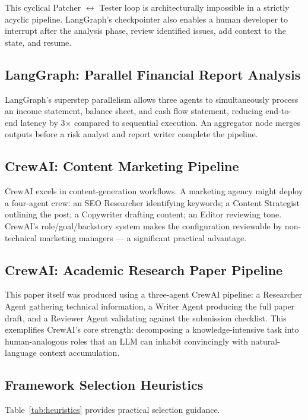 \documentclass[12pt,a4paper]{article}
\begin{document}
This cyclical Patcher $\leftrightarrow$ Tester loop is architecturally
impossible in a strictly acyclic pipeline. LangGraph's checkpointer also
enables a human developer to interrupt after the analysis phase, review
identified issues, add context to the state, and resume.

\subsection{LangGraph: Parallel Financial Report Analysis}

LangGraph's superstep parallelism allows three agents to simultaneously
process an income statement, balance sheet, and cash flow statement, reducing
end-to-end latency by 3$\times$ compared to sequential execution. An aggregator
node merges outputs before a risk analyst and report writer complete the
pipeline.

\subsection{CrewAI: Content Marketing Pipeline}

CrewAI excels in content-generation workflows. A marketing agency might deploy
a four-agent crew: an SEO Researcher identifying keywords; a Content Strategist
outlining the post; a Copywriter drafting content; an Editor reviewing tone.
CrewAI's role/goal/backstory system makes the configuration reviewable by
non-technical marketing managers --- a significant practical advantage.

\subsection{CrewAI: Academic Research Paper Pipeline}

This paper itself was produced using a three-agent CrewAI pipeline: a
Researcher Agent gathering technical information, a Writer Agent producing the
full paper draft, and a Reviewer Agent validating against the submission
checklist. This exemplifies CrewAI's core strength: decomposing a
knowledge-intensive task into human-analogous roles that an LLM can inhabit
convincingly with natural-language context accumulation.

\subsection{Framework Selection Heuristics}

Table~\ref{tab:heuristics} provides practical selection guidance.
\end{document}
